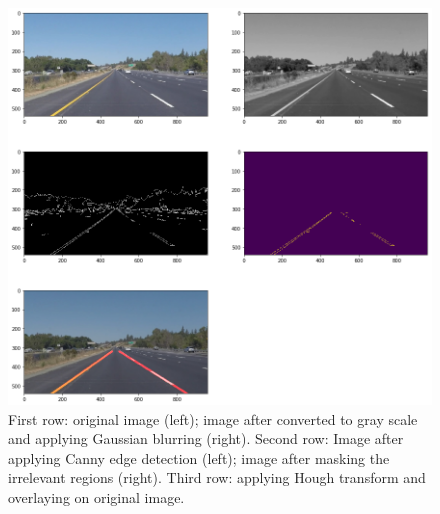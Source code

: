 \documentclass[12pt,twoside]{article}
\begin{document}
\begin{figure}[H]
	\begin{center}
		\includegraphics[width = 1.0\hsize]{./figures/pipeline.png} 
		\caption{First row: original image (left); image after converted to gray scale and applying Gaussian blurring (right). Second row: Image after applying Canny edge detection (left); image after masking the irrelevant regions (right). Third row: applying Hough transform and overlaying on original image.} %
		\label{fig:pipeline} %
	\end{center}
\end{figure}


\newpage
\end{document}
